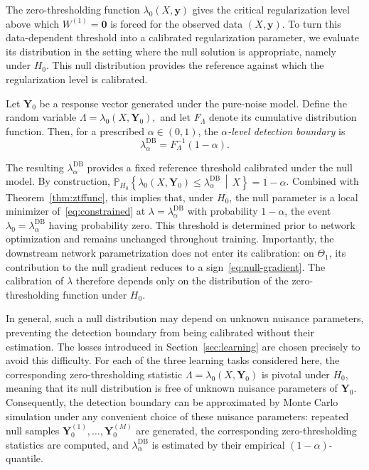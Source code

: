 \documentclass[twoside,11pt]{article}
\newcommand{\lamDB}{\lambda_\alpha^{\mathrm{DB}}}
\newcommand{\by}{\mathbf{y}}
\newcommand{\Wone}{W^{(1)}}
\newcommand{\Thetaone}{\Theta_{1}}
\begin{document}
The zero-thresholding function $\lambda_0(X,\by)$ gives the critical regularization level above which $\Wone=\mathbf 0$ is forced for the observed data $(X,\by)$. To turn this data-dependent threshold into a calibrated regularization parameter, we evaluate its distribution in the setting where the null solution is appropriate, namely under $H_0$. This null distribution provides the reference against which the regularization level is calibrated.

\begin{definition}\label{def:db}
Let $\mathbf{Y}_0$ be a response vector generated under the pure-noise model. Define the random variable $\Lambda=\lambda_0(X, \mathbf{Y}_0),$
and let $F_{\Lambda}$ denote its cumulative distribution function. Then, for a prescribed $\alpha\in(0,1)$, the \emph{$\alpha$-level detection boundary} is
\begin{equation*}
    \lambda_\alpha^{\mathrm{DB}}=F_{\Lambda}^{-1}(1-\alpha).
\end{equation*}
\end{definition}

The resulting $\lambda_\alpha^{\mathrm{DB}}$ provides a fixed reference threshold calibrated under the null model. By construction, $\mathbb P_{H_0}\left\{\lambda_0(X,\mathbf Y_0)\leq\lambda_\alpha^{\mathrm{DB}}\,\middle|\,X\right\}=1-\alpha$. Combined with Theorem~\ref{thm:ztffunc}, this implies that, under $H_0$, the null parameter is a local minimizer of~\eqref{eq:constrained} at $\lambda=\lamDB$ with probability $1-\alpha$, the event $\lambda_0=\lamDB$ having probability zero. This threshold is determined prior to network optimization and remains unchanged throughout training. Importantly, the downstream network parametrization does not enter its calibration: on $\Thetaone$, its contribution to the null gradient reduces to a sign~\eqref{eq:null-gradient}. The calibration of $\lambda$ therefore depends only on the distribution of the zero-thresholding function under $H_0$. 

In general, such a null distribution may depend on unknown nuisance
parameters, preventing the detection boundary from being calibrated without their estimation. The losses introduced in Section~\ref{sec:learning} are chosen precisely to avoid this difficulty. For each of the three learning tasks considered here, the corresponding zero-thresholding statistic
$\Lambda=\lambda_0(X,\mathbf Y_0)$ is pivotal under $H_0$, meaning that its null distribution is free of unknown nuisance parameters of $\mathbf Y_0$. Consequently, the detection boundary can be approximated by Monte Carlo simulation under any convenient choice of these nuisance parameters: repeated null samples $\mathbf Y_0^{(1)},\ldots,\mathbf Y_0^{(M)}$ are generated, the
corresponding zero-thresholding statistics are computed, and
$\lambda_\alpha^{\mathrm{DB}}$ is estimated by their empirical
$(1-\alpha)$-quantile.
\end{document}
